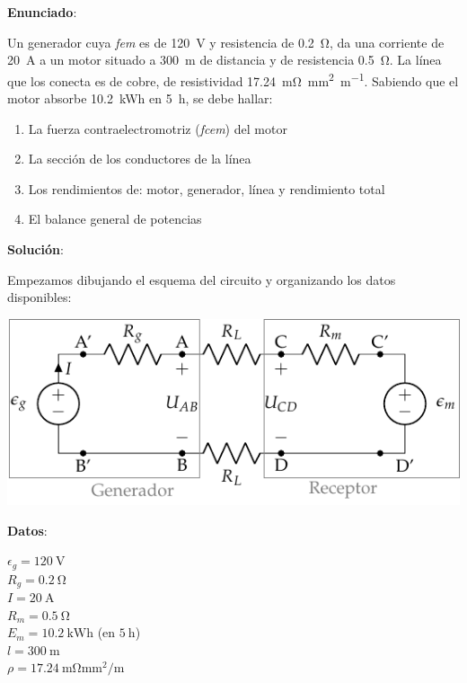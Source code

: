 \documentclass[10pt]{article}
\begin{document}
\large{\textbf{Enunciado}}:

\vspace{3mm}
Un generador cuya \textit{fem} es de \qty{120}{\volt} y resistencia de \qty{0.2}{\ohm}, da una corriente de \qty{20}{\ampere} a un motor situado a \qty{300}{\meter} de distancia y de resistencia \qty{0.5}{\ohm}. La línea que los conecta es de cobre, de resistividad \qty{17.24}{\milli\ohm\milli\meter\squared\per\meter}. Sabiendo que el motor absorbe \qty{10.2}{\kWh} en \qty{5}{\hour}, se debe hallar:
\vspace{3mm}

\begin{enumerate}
    \item La fuerza contraelectromotriz (\textit{fcem}) del motor
    \item La sección de los conductores de la línea
    \item Los rendimientos de: motor, generador, línea y rendimiento total
    \item El balance general de potencias
\end{enumerate}


\hrulefill

\vspace{5mm}
\textbf{Solución}:
\vspace{4mm}

Empezamos dibujando el esquema del circuito y organizando los datos disponibles:
\vspace{6mm}

\begin{minipage}{0.73\linewidth}
  \includegraphics[scale=1.25]{figs/circuito_lkv.pdf}
\end{minipage}
\begin{minipage}{0.27\linewidth}
  \textbf{Datos}:
  \vspace{2mm}
  
  $\epsilon_g = \qty{120}{\volt}$\\
  $R_g = \qty{0.2}{\ohm}$\\
  $I = \qty{20}{\ampere}$\\
  $R_m = \qty{0.5}{\ohm}$\\
  $E_m = \qty{10.2}{\kWh}$ (en $\qty{5}{\hour}$)\\
  $l = \qty{300}{\meter}$\\
  $\rho = \qty{17.24}{\milli\ohm\milli\meter\squared\per\meter}$
\end{minipage}
\end{document}
